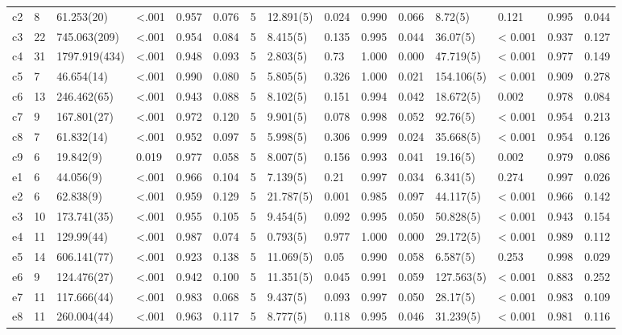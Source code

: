\documentclass[man]{apa6}
\theoremstyle{definition}
\theoremstyle{definition}
\theoremstyle{definition}
\theoremstyle{remark}
\begin{document}
\begin{table}
{\begin{tabular}[t]{lllllllllllllll}
c2 & 8 & 61.253(20) & <.001 & 0.957 & 0.076 & 5 & 12.891(5) & 0.024 & 0.990 & 0.066 & 8.72(5) & 0.121 & 0.995 & 0.044\\
c3 & 22 & 745.063(209) & <.001 & 0.954 & 0.084 & 5 & 8.415(5) & 0.135 & 0.995 & 0.044 & 36.07(5) & < 0.001 & 0.937 & 0.127\\
c4 & 31 & 1797.919(434) & <.001 & 0.948 & 0.093 & 5 & 2.803(5) & 0.73 & 1.000 & 0.000 & 47.719(5) & < 0.001 & 0.977 & 0.149\\
c5 & 7 & 46.654(14) & <.001 & 0.990 & 0.080 & 5 & 5.805(5) & 0.326 & 1.000 & 0.021 & 154.106(5) & < 0.001 & 0.909 & 0.278\\
c6 & 13 & 246.462(65) & <.001 & 0.943 & 0.088 & 5 & 8.102(5) & 0.151 & 0.994 & 0.042 & 18.672(5) & 0.002 & 0.978 & 0.084\\
c7 & 9 & 167.801(27) & <.001 & 0.972 & 0.120 & 5 & 9.901(5) & 0.078 & 0.998 & 0.052 & 92.76(5) & < 0.001 & 0.954 & 0.213\\
c8 & 7 & 61.832(14) & <.001 & 0.952 & 0.097 & 5 & 5.998(5) & 0.306 & 0.999 & 0.024 & 35.668(5) & < 0.001 & 0.954 & 0.126\\
c9 & 6 & 19.842(9) & 0.019 & 0.977 & 0.058 & 5 & 8.007(5) & 0.156 & 0.993 & 0.041 & 19.16(5) & 0.002 & 0.979 & 0.086\\
e1 & 6 & 44.056(9) & <.001 & 0.966 & 0.104 & 5 & 7.139(5) & 0.21 & 0.997 & 0.034 & 6.341(5) & 0.274 & 0.997 & 0.026\\
e2 & 6 & 62.838(9) & <.001 & 0.959 & 0.129 & 5 & 21.787(5) & 0.001 & 0.985 & 0.097 & 44.117(5) & < 0.001 & 0.966 & 0.142\\
e3 & 10 & 173.741(35) & <.001 & 0.955 & 0.105 & 5 & 9.454(5) & 0.092 & 0.995 & 0.050 & 50.828(5) & < 0.001 & 0.943 & 0.154\\
e4 & 11 & 129.99(44) & <.001 & 0.987 & 0.074 & 5 & 0.793(5) & 0.977 & 1.000 & 0.000 & 29.172(5) & < 0.001 & 0.989 & 0.112\\
e5 & 14 & 606.141(77) & <.001 & 0.923 & 0.138 & 5 & 11.069(5) & 0.05 & 0.990 & 0.058 & 6.587(5) & 0.253 & 0.998 & 0.029\\
e6 & 9 & 124.476(27) & <.001 & 0.942 & 0.100 & 5 & 11.351(5) & 0.045 & 0.991 & 0.059 & 127.563(5) & < 0.001 & 0.883 & 0.252\\
e7 & 11 & 117.666(44) & <.001 & 0.983 & 0.068 & 5 & 9.437(5) & 0.093 & 0.997 & 0.050 & 28.17(5) & < 0.001 & 0.983 & 0.109\\
e8 & 11 & 260.004(44) & <.001 & 0.963 & 0.117 & 5 & 8.777(5) & 0.118 & 0.995 & 0.046 & 31.239(5) & < 0.001 & 0.981 & 0.116\\

\end{tabular}}
\end{table}
\end{document}
